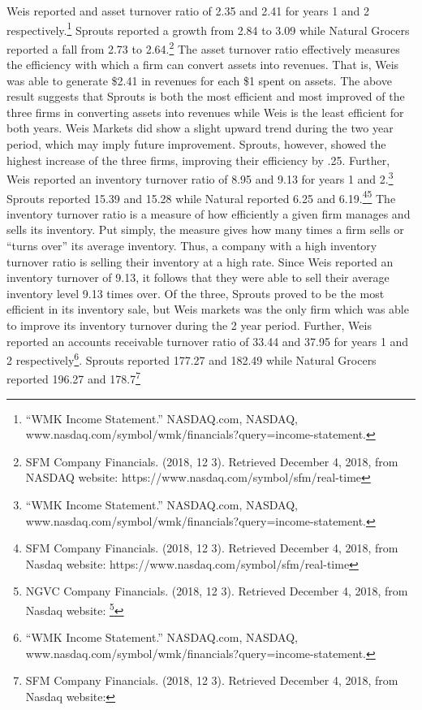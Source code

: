 \documentclass[12pt]{article}
\begin{document}
\begin{doublespacing}
Weis reported and asset turnover ratio of 2.35 and 2.41 for years 1 and 2 respectively.\footnote{“WMK Income Statement.” NASDAQ.com, NASDAQ, www.nasdaq.com/symbol/wmk/financials?query=income-statement.} Sprouts reported a growth from 2.84 to 3.09 while Natural Grocers reported a fall from 2.73 to 2.64.\footnote{SFM Company Financials. (2018, 12 3). Retrieved December 4, 2018, from NASDAQ website: https://www.nasdaq.com/symbol/sfm/real-time } The asset turnover ratio effectively measures the efficiency with which a firm can convert assets into revenues. That is, Weis was able to generate \$2.41 in revenues for each \$1 spent on assets. The above result suggests that Sprouts is both the most efficient and most improved of the three firms in converting assets into revenues while Weis is the least efficient for both years. Weis Markets did show a slight upward trend during the two year period, which may imply future improvement. Sprouts, however, showed the highest increase of the three firms, improving their efficiency by .25. Further, Weis reported an inventory turnover ratio of 8.95 and 9.13 for years 1 and 2.\footnote{“WMK Income Statement.” NASDAQ.com, NASDAQ, www.nasdaq.com/symbol/wmk/financials?query=income-statement.} Sprouts reported 15.39 and 15.28 while Natural reported 6.25 and 6.19.\footnote{SFM Company Financials. (2018, 12 3). Retrieved December 4, 2018, from Nasdaq website: 
     https://www.nasdaq.com/symbol/sfm/real-time }\footnote{NGVC Company Financials. (2018, 12 3). Retrieved December 4, 2018, from Nasdaq website: 
     \footnote{SFM Company Financials. (2018, 12 3). Retrieved December 4, 2018, from Nasdaq 
     website: https://www.nasdaq.com/symbol/sfm/real-time } } The inventory turnover ratio is a measure of how efficiently a given firm manages and sells its inventory. Put simply, the measure gives how many times a firm sells or “turns over” its average inventory. Thus, a company with a high inventory turnover ratio is selling their inventory at a high rate. Since Weis reported an inventory turnover of 9.13, it follows that they were able to sell their average inventory level 9.13 times over. Of the three, Sprouts proved to be the most efficient in its inventory sale, but Weis markets was the only firm which was able to improve its inventory turnover during the 2 year period. Further, Weis reported an accounts receivable turnover ratio of 33.44 and 37.95 for years 1 and 2 respectively\footnote{“WMK Income Statement.” NASDAQ.com, NASDAQ, www.nasdaq.com/symbol/wmk/financials?query=income-statement.}. Sprouts reported 177.27 and 182.49 while Natural Grocers reported 196.27 and 178.7\footnote{SFM Company Financials. (2018, 12 3). Retrieved December 4, 2018, from Nasdaq website: 
}
\end{doublespacing}
\end{document}
